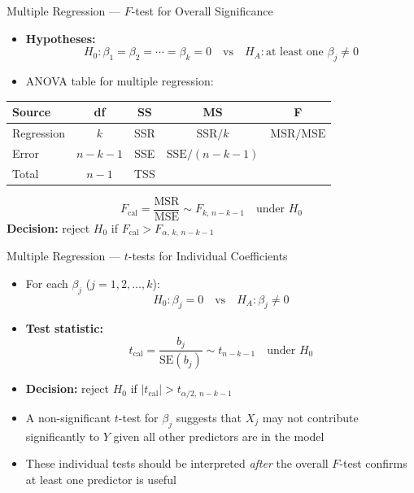 \documentclass[12pt, aspectratio=169]{beamer}
\begin{document}
    \begin{frame}{Multiple Regression --- $F$-test for Overall Significance}
        \begin{itemize}
            \item \textbf{Hypotheses:}
                \[
                    H_0: \beta_1 = \beta_2 = \cdots = \beta_k = 0
                    \quad \text{vs} \quad
                    H_A: \text{at least one } \beta_j \neq 0
                \]
            \item ANOVA table for multiple regression:
        \end{itemize}
        \begin{center}
            \begin{tabular}{lcccc}
                \toprule
                \textbf{Source} & \textbf{df} & \textbf{SS} & \textbf{MS} & \textbf{F} \\
                \midrule
                Regression & $k$     & SSR & $\text{SSR}/k$     & $\text{MSR}/\text{MSE}$ \\
                Error      & $n-k-1$ & SSE & $\text{SSE}/(n-k-1)$ & \\
                Total      & $n-1$   & TSS & & \\
                \bottomrule
            \end{tabular}
        \end{center}
        \[
            F_{\text{cal}} = \frac{\text{MSR}}{\text{MSE}} \sim F_{k,\,n-k-1}
            \quad \text{under } H_0
        \]
        \textbf{Decision:} reject $H_0$ if $F_{\text{cal}} > F_{\alpha,\,k,\,n-k-1}$
    \end{frame}


    \begin{frame}{Multiple Regression --- $t$-tests for Individual Coefficients}
        \begin{itemize}
            \item For each $\beta_j$ ($j = 1, 2, \ldots, k$):
                \[
                    H_0: \beta_j = 0 \quad \text{vs} \quad H_A: \beta_j \neq 0
                \]
            \item \textbf{Test statistic:}
                \[
                    t_{\text{cal}} = \frac{b_j}{\mathrm{SE}(b_j)} \sim t_{n-k-1}
                    \quad \text{under } H_0
                \]
            \item \textbf{Decision:} reject $H_0$ if
                $|t_{\text{cal}}| > t_{\alpha/2,\,n-k-1}$
            \item A non-significant $t$-test for $\beta_j$ suggests that $X_j$ may not contribute significantly to $Y$ given all other predictors are in the model
            \item These individual tests should be interpreted \emph{after} the overall $F$-test confirms at least one predictor is useful
        \end{itemize}
    \end{frame}
\end{document}
